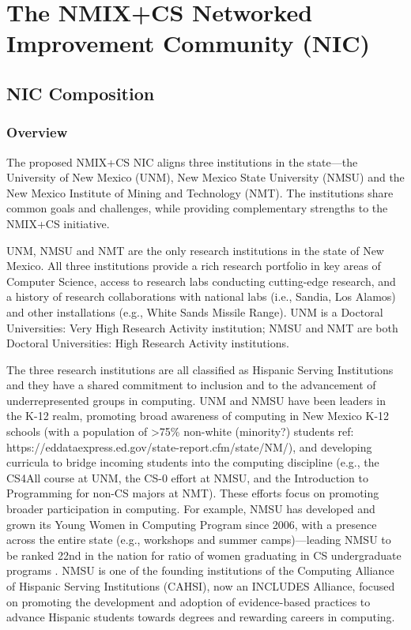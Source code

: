 \section{The NMIX+CS Networked Improvement Community (NIC)}
\label{sec:consortium}

\subsection{NIC Composition}

\subsubsection{Overview}
The proposed NMIX+CS NIC aligns  three  institutions in the state---the University of New Mexico (UNM), New Mexico State University (NMSU) and the New Mexico Institute of Mining and Technology (NMT). The institutions share common goals and challenges, while providing complementary strengths to the NMIX+CS initiative. 

UNM, NMSU and NMT are the only research institutions in the state of New Mexico. All three institutions provide a rich research portfolio in key areas of Computer Science, access to research labs conducting cutting-edge research, and a history of research collaborations with national labs (i.e., Sandia, Los Alamos) and other installations (e.g., White Sands Missile Range). UNM is a 
Doctoral Universities: Very High Research Activity institution;
NMSU and NMT are both Doctoral Universities: High Research Activity institutions. 

The three research institutions are all classified as Hispanic Serving Institutions and they have a shared commitment to inclusion and to the advancement of underrepresented groups in computing. UNM and NMSU have been leaders in the K-12 realm, promoting broad awareness of computing in New Mexico K-12 schools (with a population of >75\% non-white (minority?) students ref: https://eddataexpress.ed.gov/state-report.cfm/state/NM/), and developing curricula to bridge incoming students into the computing discipline (e.g., the CS4All course at UNM, the CS-0 effort at NMSU, and the Introduction to Programming for non-CS majors at NMT). These efforts focus on promoting broader participation in computing. For example, NMSU has developed and grown its Young Women in Computing Program since 2006, with a presence across the entire state (e.g., workshops and summer camps)---leading NMSU to be ranked 22nd in the nation for ratio of women graduating in CS  undergraduate programs \cite{https://www.chronicle.com/article/Which-Colleges-Are-Best-and/245758}. NMSU is one of the founding institutions of the Computing Alliance of Hispanic Serving Institutions (CAHSI), now an INCLUDES Alliance, focused on promoting the development and adoption of evidence-based practices to advance Hispanic students towards degrees and rewarding careers in computing. 

